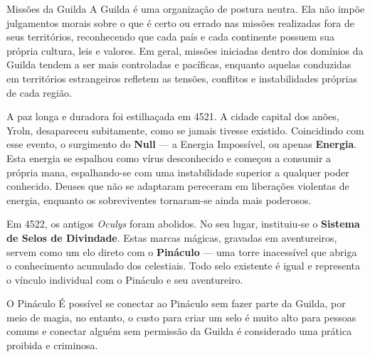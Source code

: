 \begin{rpgboxtips}{Missões da Guilda}
A Guilda é uma organização de postura neutra. Ela não impõe julgamentos morais sobre o que é certo ou errado nas missões realizadas fora de seus territórios, reconhecendo que cada país e cada continente possuem sua própria cultura, leis e valores. Em geral, missões iniciadas dentro dos domínios da Guilda tendem a ser mais controladas e pacíficas, enquanto aquelas conduzidas em territórios estrangeiros refletem as tensões, conflitos e instabilidades próprias de cada região.
\end{rpgboxtips}

A paz longa e duradora foi estilhaçada em 4521. A cidade capital dos anões, Yroln, desapareceu subitamente, como se jamais tivesse existido. Coincidindo com esse evento, o surgimento do \textbf{Null} — a Energia Impossível, ou apenas \textbf{Energia}. Esta energia se espalhou como vírus desconhecido e começou a consumir a própria mana, espalhando-se com uma instabilidade superior a qualquer poder conhecido. Deuses que não se adaptaram pereceram em liberações violentas de energia, enquanto os sobreviventes tornaram-se ainda mais poderosos.

Em 4522, os antigos \textit{Oculys} foram abolidos. No seu lugar, instituiu-se o \textbf{Sistema de Selos de Divindade}. Estas marcas mágicas, gravadas em aventureiros, servem como um elo direto com o \textbf{Pináculo} — uma torre inacessível que abriga o conhecimento acumulado dos celestiais. Todo selo existente é igual e representa o vínculo individual com o Pináculo e seu aventureiro.

\begin{rpgboxtips}{O Pináculo}
    É possível se conectar ao Pináculo sem fazer parte da Guilda, por meio de magia, no entanto, o custo para criar um selo é muito alto para pessoas comuns e conectar alguém sem permissão da Guilda é considerado uma prática proibida e criminosa. 
\end{rpgboxtips}

